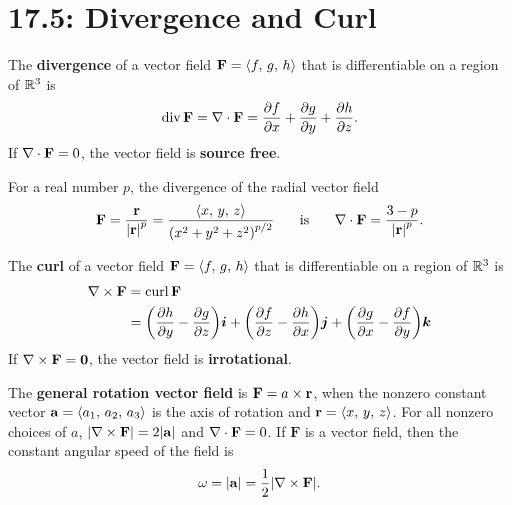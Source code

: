 \documentclass[mathNotesPreamble]{subfiles}
\begin{document}
\section{17.5: Divergence and Curl}

  \begin{defn*}
    The \textbf{divergence} of a vector field $\mathbf F={\left\langle f,\,g,\,h \right\rangle}$ that is differentiable on a region of $\mathbb{R}^3$ is 
      \[\operatorname{div} \mathbf F=\nabla\cdot\mathbf F=\frac{\partial f}{\partial x}+\frac{\partial g}{\partial y}+\frac{\partial h}{\partial z}.\]
    If $\nabla\cdot\mathbf F=0$, the vector field is \textbf{source free}.
  \end{defn*}

  \begin{thmBox*}
    For a real number $p$, the divergence of the radial vector field
      \[\mathbf F=\frac{{\mathbf{r}}}{{\left\vert{\mathbf{r}}\right\vert}^p}=\frac{{\left\langle x,\,y,\,z \right\rangle}}{{\left(x^2+y^2+z^2\right)}^{p/2}} \hspace*{15pt}\textnormal{ is }\hspace*{15pt} \nabla\cdot\mathbf F= \frac{3-p}{{\left\vert{\mathbf{r}}\right\vert}^p}.\]
  \end{thmBox*}

  \begin{defn*}
    The \textbf{curl} of a vector field $\mathbf F={\left\langle f,\,g,\,h \right\rangle}$ that is differentiable on a region of $\mathbb{R}^3$ is
    \begin{align*}
      \nabla\times\mathbf F&=\operatorname{curl} \mathbf F\\
        &={\left(\frac{\partial h}{\partial y}-\frac{\partial g}{\partial z}\right)}{\bm{i}}+{\left(\frac{\partial f}{\partial z}-\frac{\partial h}{\partial x}\right)}{\bm{j}}+{\left(\frac{\partial g}{\partial x}-\frac{\partial f}{\partial y}\right)}{\bm{k}}
    \end{align*}
    If $\nabla\times\mathbf F=\mathbf{0}$, the vector field is \textbf{irrotational}.
  \end{defn*}

  \begin{thmBox*}
    The \textbf{general rotation vector field} is $\mathbf F=a\times{\mathbf{r}}$, when the nonzero constant vector $\mathbf a={\left\langle a_1,\,a_2,\,a_3 \right\rangle}$ is the axis of rotation and ${\mathbf{r}}={\left\langle x,\,y,\,z \right\rangle}$. For all nonzero choices of $a$, ${\left\vert\nabla\times\mathbf F\right\vert}=2{\left\vert{\mathbf{a}}\right\vert}$ and $\nabla\cdot\mathbf F=0$. If $\mathbf F$ is a vector field, then the constant angular speed of the field is
      \[\omega ={\left\vert{\mathbf{a}}\right\vert}=\frac{1}{2}{\left\vert\nabla\times\mathbf F\right\vert}.\]
  \end{thmBox*}
\end{document}
